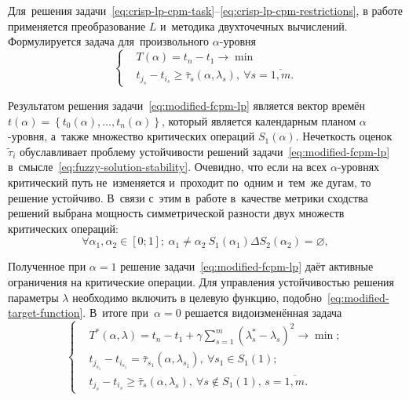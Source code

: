 Для~решения задачи~\eqref{eq:crisp-lp-cpm-task}--\eqref{eq:crisp-lp-cpm-restrictions}, в работе применяется преобразование $L$ и~методика двухточечных вычислений. Формулируется задача для~произвольного $\alpha$-уровня
\begin{equation}
\label{eq:modified-fcpm-lp}
  \left\{ \begin{aligned}
    & T(\alpha )=t_n-t_1\to \min  \\ 
    & t_{j_s}-t_{i_s}\geqslant \bar{\tau}_s\left(\alpha,\lambda_s \right),\ \forall s=\overline{1,m}.
  \end{aligned} \right.
\end{equation}

Результатом решения задачи~\eqref{eq:modified-fcpm-lp} является вектор времён $t\left( \alpha \right)=\left\{ t_0\left(\alpha\right),\ldots,t_n\left(\alpha \right) \right\}$, который является календарным планом $\alpha$-уровня, а~также множество критических операций $S_1\left( \alpha \right)$. Нечеткость оценок $\tilde{\tau}_i$ обуславливает проблему устойчивости решений задачи~\eqref{eq:modified-fcpm-lp} в~смысле~\eqref{eq:fuzzy-solution-stability}. Очевидно, что если на всех $\alpha $-уровнях критический путь не~изменяется и~проходит по~одним и~тем~же дугам, то решение устойчиво. В~связи с~этим в~работе в~качестве метрики сходства решений выбрана мощность симметрической разности двух множеств критических операций:
\begin{equation}
\label{eq:modified-cpm-lp-stability}
  \forall \alpha_1, \alpha_2\in \left[ 0;1 \right];\ \alpha_1\ne \alpha_2\ S_1\left(\alpha_1 \right)\Delta S_2\left(\alpha_2 \right)=\varnothing,
\end{equation}

Полученное при $\alpha=1$ решение задачи~\eqref{eq:modified-fcpm-lp} даёт активные ограничения на критические операции. Для управления устойчивостью решения параметры $\lambda$ необходимо включить в целевую функцию, подобно~\eqref{eq:modified-target-function}. В~итоге при~$\alpha=0$ решается видоизменённая задача
\begin{equation}
\label{eq:modified-fcpm-lp-alpha}
  \left \{ \begin{aligned}
    & T^* \left(\alpha, \lambda \right) = t_n-t_1+\gamma \sum \limits_{s=1}^{m} \left(\lambda_s^*-\lambda_s \right)^2 \to \min; \\
    & t_{j_{s_1}}-t_{i_{s_1}} = \bar{\tau}_{s_1}\left(\alpha, \lambda_{s_1} \right),\ \forall s_1 \in S_1\left(1\right); \\
    & t_{j_s}-t_{i_s} \geqslant \bar{\tau}_s\left(\alpha, \lambda_s \right),\ \forall s \notin S_1\left(1\right),\,s=\overline{1,m}.
  \end{aligned} \right.
\end{equation}

